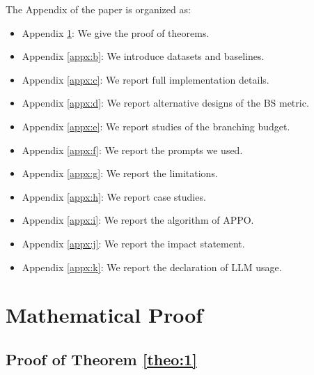 \documentclass{llmxive}
\begin{document}
 \begin{center}\Large{\textbf{}}\end{center}
The Appendix of the paper is organized as:
\begin{itemize}
    \item Appendix \ref{appx:a}: We give the proof of theorems.
    \item Appendix \ref{appx:b}: We introduce datasets and baselines.
    \item Appendix \ref{appx:c}: We report full implementation details.
    \item Appendix \ref{appx:d}: We report alternative designs of the BS metric.
    \item Appendix \ref{appx:e}: We report studies of the branching budget.
    \item Appendix \ref{appx:f}: We report the prompts we used.
    \item Appendix \ref{appx:g}: We report the limitations.
    \item Appendix \ref{appx:h}: We report case studies.
    \item Appendix \ref{appx:i}: We report the algorithm of APPO. 
    \item Appendix \ref{appx:j}: We report the impact statement. 
    \item Appendix \ref{appx:k}: We report the declaration of LLM usage. 
\end{itemize}

\section{Mathematical Proof}
\label{appx:a}

\subsection{Proof of Theorem \ref{theo:1}} 
\label{proof:theorem1}
\end{document}
